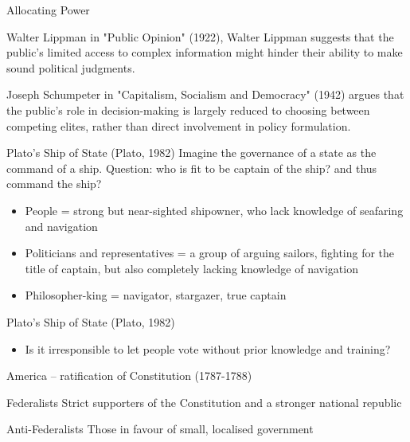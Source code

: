 \documentclass{beamer}
\begin{document}

\begin{frame}{Allocating Power}
\begin{block}{Walter Lippman}
in "Public Opinion" (1922), Walter Lippman suggests that the public's limited access to complex information might hinder their ability to make sound political judgments.
\end{block}

\begin{block}{ Joseph Schumpeter }
in "Capitalism, Socialism and Democracy" (1942) argues that the public's role in decision-making is largely reduced to choosing between competing elites, rather than direct involvement in policy formulation.
\end{block}
\end{frame}


\begin{frame}{Plato’s Ship of State (Plato, 1982)}
Imagine the governance of a state as the command of a ship.
Question: who is fit to be captain of the ship? and thus command the ship?
\begin{itemize}
    \item People = strong but near-sighted shipowner, who lack knowledge of seafaring and navigation
    \item Politicians and representatives = a group of arguing sailors, fighting for the title of captain, but also completely lacking knowledge of navigation
    \item Philosopher-king = navigator, stargazer, true captain
\end{itemize}
\end{frame}

\begin{frame}{Plato’s Ship of State (Plato, 1982)}
\begin{itemize}
    \item Is it irresponsible to let people vote without prior knowledge and training?
\end{itemize}

\end{frame}


\begin{frame}{America –  ratification of Constitution (1787-1788)}
\begin{block}{Federalists}
Strict supporters of the Constitution and a stronger national republic
\end{block}

\begin{block}{Anti-Federalists}
Those in favour of small, localised government
\end{block}

\end{frame}
\end{document}

